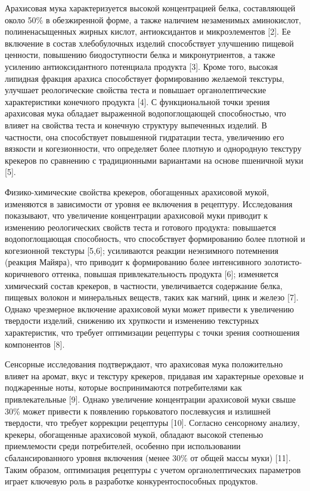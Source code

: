 {{{Арахисовая мука характеризуется высокой концентрацией белка,
составляющей около 50\% в обезжиренной форме, а также наличием
незаменимых аминокислот, полиненасыщенных жирных кислот, антиоксидантов
и микроэлементов {[}2{]}. Ее включение в состав хлебобулочных изделий
способствует улучшению пищевой ценности, повышению биодоступности белка
и микронутриентов, а также усилению антиоксидантного потенциала продукта
{[}3{]}. Кроме того, высокая липидная фракция арахиса способствует
формированию желаемой текстуры, улучшает реологические свойства теста и
повышает органолептические характеристики конечного продукта {[}4{]}. С
функциональной точки зрения арахисовая мука обладает выраженной
водопоглощающей способностью, что влияет на свойства теста и конечную
структуру выпеченных изделий. В частности, она способствует повышенной
гидратации теста, увеличению его вязкости и когезионности, что
определяет более плотную и однородную текстуру крекеров по сравнению с
традиционными вариантами на основе пшеничной муки {[}5{]}.

Физико-химические свойства крекеров, обогащенных арахисовой мукой,
изменяются в зависимости от уровня ее включения в рецептуру.
Исследования показывают, что увеличение концентрации арахисовой муки
приводит к изменению реологических свойств теста и готового продукта:
повышается водопоглощающая способность, что способствует формированию
более плотной и когезионной текстуры {[}5,6{]}; усиливаются реакции
неэнзимного потемнения (реакция Майяра), что приводит к формированию
более интенсивного золотисто-коричневого оттенка, повышая
привлекательность продукта {[}6{]}; изменяется химический состав
крекеров, в частности, увеличивается содержание белка, пищевых волокон и
минеральных веществ, таких как магний, цинк и железо {[}7{]}. Однако
чрезмерное включение арахисовой муки может привести к увеличению
твердости изделий, снижению их хрупкости и изменению текстурных
характеристик, что требует оптимизации рецептуры с точки зрения
соотношения компонентов {[}8{]}.

Сенсорные исследования подтверждают, что арахисовая мука положительно
влияет на аромат, вкус и текстуру крекеров, придавая им характерные
ореховые и поджаренные ноты, которые воспринимаются потребителями как
привлекательные {[}9{]}. Однако увеличение концентрации арахисовой муки
свыше 30\% может привести к появлению горьковатого послевкусия и
излишней твердости, что требует коррекции рецептуры {[}10{]}. Согласно
сенсорному анализу, крекеры, обогащенные арахисовой мукой, обладают
высокой степенью приемлемости среди потребителей, особенно при
использовании сбалансированного уровня включения (менее 30\% от общей
массы муки) {[}11{]}. Таким образом, оптимизация рецептуры с учетом
органолептических параметров играет ключевую роль в разработке
конкурентоспособных продуктов.

}}}
